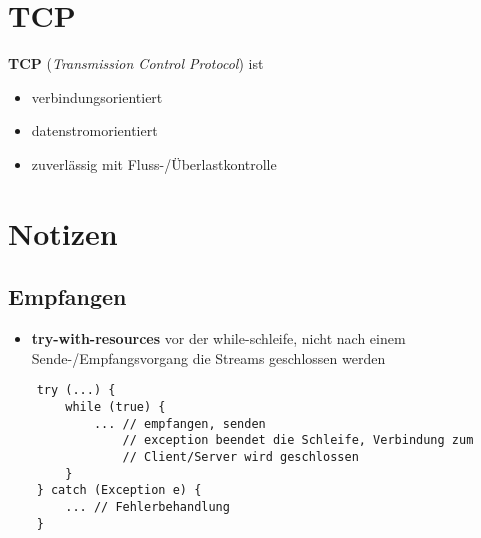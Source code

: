 \section{TCP}

\textbf{TCP} (\textit{Transmission Control Protocol}) ist

\begin{itemize}
    \item verbindungsorientiert
    \item datenstromorientiert
    \item zuverlässig mit Fluss-/Überlastkontrolle
\end{itemize}


\section*{Notizen}

\subsection*{Empfangen}
\begin{itemize}
    \item \textbf{try-with-resources} vor der while-schleife, nicht nach einem Sende-/Empfangsvorgang die Streams geschlossen werden
\end{itemize}


\begin{verbatim}
    try (...) {
        while (true) {
            ... // empfangen, senden
                // exception beendet die Schleife, Verbindung zum
                // Client/Server wird geschlossen
        }
    } catch (Exception e) {
        ... // Fehlerbehandlung
    }
\end{verbatim}
